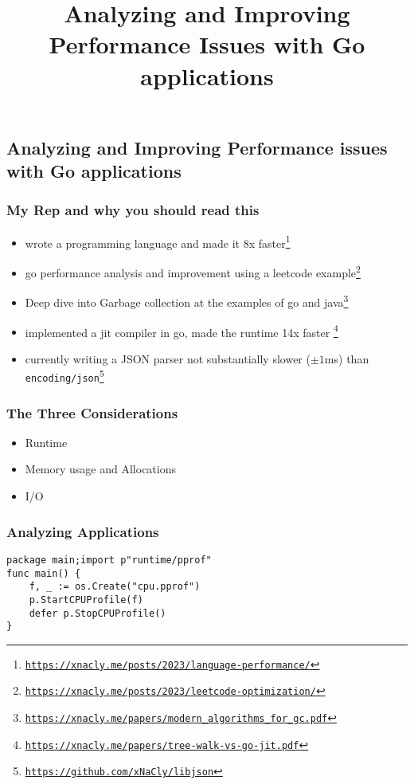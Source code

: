 

\title{Analyzing and Improving Performance Issues with Go applications}


    \subsection*{Analyzing and Improving Performance issues with Go applications}
    \subsubsection*{My Rep and why you should read this}
    \begin{itemize}
        \item wrote a programming language and made it 8x faster\footnote{\href{https://xnacly.me/posts/2023/language-performance/}{\texttt{https://xnacly.me/posts/2023/language-performance/}}}
        \item go performance analysis and improvement using a leetcode example\footnote{\href{https://xnacly.me/posts/2023/leetcode-optimization/}{\texttt{https://xnacly.me/posts/2023/leetcode-optimization/}}}
        \item Deep dive into Garbage collection at the examples of go and java\footnote{\href{https://xnacly.me/papers/modern_algorithms_for_gc.pdf}{\texttt{https://xnacly.me/papers/modern\_algorithms\_for\_gc.pdf}}}
        \item implemented a jit compiler in go, made the runtime 14x faster \footnote{\href{https://xnacly.me/papers/tree-walk-vs-go-jit.pdf}{\texttt{https://xnacly.me/papers/tree-walk-vs-go-jit.pdf}}}
        \item currently writing a JSON parser not substantially slower ($\pm1$ms) than \texttt{encoding/json}\footnote{\href{https://github.com/xNaCly/libjson}{\texttt{https://github.com/xNaCly/libjson}}}
    \end{itemize}
    \subsubsection*{The Three Considerations}
    \begin{itemize}
        \item Runtime
        \item Memory usage and Allocations
        \item I/O
    \end{itemize}
    \subsubsection*{Analyzing Applications}
    \begin{verbatim}
package main;import p"runtime/pprof"
func main() {
    f, _ := os.Create("cpu.pprof")
    p.StartCPUProfile(f)
    defer p.StopCPUProfile()
}
    \end{verbatim}
